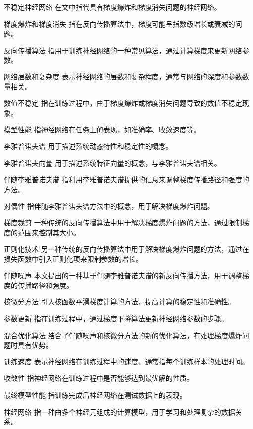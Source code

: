 
\begin{denotation}[3cm]
  \item[不稳定神经网络] 在文中指代具有梯度爆炸和梯度消失问题的神经网络。
  \item[梯度爆炸和梯度消失] 指在反向传播算法中，梯度可能呈指数级增长或衰减的问题。
  \item[反向传播算法] 指用于训练神经网络的一种常见算法，通过计算梯度来更新网络参数。
  \item[网络层数和复杂度] 表示神经网络的层数和复杂程度，通常与网络的深度和参数数量相关。
  \item[数值不稳定] 指在训练过程中，由于梯度爆炸或梯度消失问题导致的数值不稳定现象。
  \item[模型性能] 指神经网络在任务上的表现，如准确率、收敛速度等。
  \item[李雅普诺夫谱] 用于描述系统动态特性和稳定性的概念。
  \item[李雅普诺夫向量] 用于描述系统特征向量的概念，与李雅普诺夫谱相关。
  \item[伴随李雅普诺夫谱] 指利用李雅普诺夫谱提供的信息来调整梯度传播路径和强度的方法。
  \item[对偶性] 指伴随李雅普诺夫谱方法中的概念，用于解决梯度爆炸问题。
  \item[梯度裁剪] 一种传统的反向传播算法中用于解决梯度爆炸问题的方法，通过限制梯度的范围来控制其大小。
  \item[正则化技术] 另一种传统的反向传播算法中用于解决梯度爆炸问题的方法，通过在损失函数中引入正则化项来限制参数的增长。
  \item[伴随噪声] 本文提出的一种基于伴随李雅普诺夫谱的新反向传播方法，用于调整梯度的传播路径和强度。
  \item[核微分方法] 引入核函数平滑梯度计算的方法，提高计算的稳定性和准确性。
  \item[参数更新] 指在训练过程中，通过梯度下降算法更新神经网络参数的步骤。
  \item[混合优化算法] 结合了伴随噪声和核微分方法的新的优化算法，在处理梯度爆炸问题时具有优势。
  \item[训练速度] 表示神经网络在训练过程中的速度，通常指每个训练样本的处理时间。
  \item[收敛性] 指神经网络在训练过程中是否能够达到最优解的性质。
  \item[最终模型性能] 指训练完成后神经网络在测试数据上的表现。
  \item[神经网络] 指一种由多个神经元组成的计算模型，用于学习和处理复杂的数据关系。
\end{denotation}



